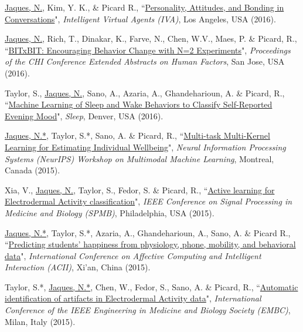 \documentclass[paper=letter,fontsize=11pt]{scrartcl} %
\newcommand{\PaperEntry}[6]{
        \noindent #1, ``\href{#6}{#2}", \textit{#3}, #4 (#5).}
\begin{document}
\begin{etaremune}
\item \PaperEntry{\underline{Jaques, N.}, Kim, Y. K., \& Picard R.}{Personality, Attitudes, and Bonding in Conversations}{Intelligent Virtual Agents (IVA)}{Los Angeles, USA}{2016}{http://affect.media.mit.edu/pdfs/16.Jaques-IVApersonality.pdf}

\item \PaperEntry{\underline{Jaques, N.}, Rich, T., Dinakar, K., Farve, N., Chen, W.V., Maes, P. \& Picard, R.}{BITxBIT: Encouraging Behavior Change with N=2 Experiments}{Proceedings of the CHI Conference Extended Abstracts on Human Factors}{San Jose, USA}{2016}{http://affect.media.mit.edu/pdfs/16.Jaques-etal-CHI.pdf}

\item \PaperEntry{Taylor, S., \underline{Jaques, N.}, Sano, A., Azaria, A., Ghandeharioun, A. \& Picard, R.}{Machine Learning of Sleep and Wake Behaviors to Classify Self-Reported Evening Mood}{Sleep}{Denver, USA}{2016}{https://affect.media.mit.edu/pdfs/16.Taylor-ClassifyingSelfReportedMood-SLEEP2016.pdf}

\item \PaperEntry{\underline{Jaques, N.*}, Taylor, S.*, Sano, A. \& Picard, R.}{Multi-task Multi-Kernel Learning for Estimating Individual Wellbeing}{Neural Information Processing Systems (NeurIPS) Workshop on Multimodal Machine Learning}{Montreal, Canada}{2015}{https://affect.media.mit.edu/pdfs/15.Jaques-etal-NIPSMMML.pdf}

\item \PaperEntry{Xia, V., \underline{Jaques, N.}, Taylor, S., Fedor, S. \& Picard, R.}{Active learning for Electrodermal Activity classification}{IEEE Conference on Signal Processing in Medicine and Biology (SPMB)}{Philadelphia, USA}{2015}{https://dspace.mit.edu/openaccess-disseminate/1721.1/109392}

\item \PaperEntry{\underline{Jaques, N.*}, Taylor, S.*, Azaria, A., Ghandeharioun, A., Sano, A. \& Picard R.}{Predicting students' happiness from physiology, phone, mobility, and behavioral data}{International Conference on Affective Computing and Intelligent Interaction (ACII)}{Xi'an, China}{2015}{https://www.ncbi.nlm.nih.gov/pmc/articles/PMC5431070/}

\item \PaperEntry{Taylor, S.*, \underline{Jaques, N.*}, Chen, W., Fedor, S., Sano, A. \& Picard, R.}{Automatic identification of artifacts in Electrodermal Activity data}{International Conference of the IEEE Engineering in Medicine and Biology Society (EMBC)}{Milan, Italy}{2015}{https://www.ncbi.nlm.nih.gov/pmc/articles/PMC5413200/}


\end{etaremune}
\end{document}
